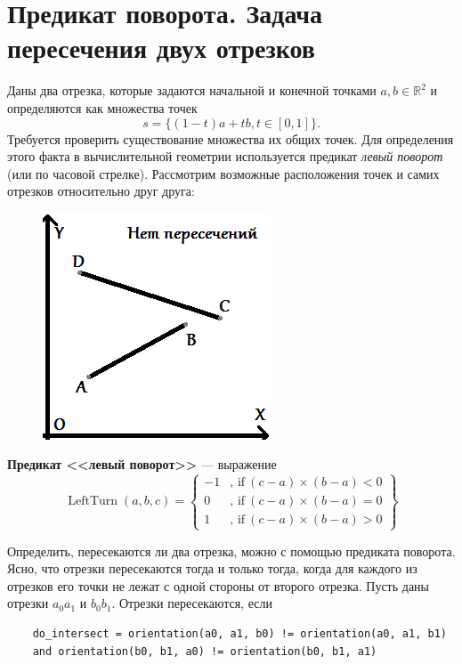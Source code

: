 \section{Предикат поворота. Задача пересечения двух отрезков}

Даны два отрезка, которые задаются начальной и конечной точками $a, b \in \mathbb{R}^2$ и определяются как множества точек
$$ s = \{ (1-t)a + tb, t \in [0,1] \}. $$
Требуется проверить существование множества их общих точек. Для определения этого факта в вычислительной геометрии используется предикат \textit{левый поворот} (или по часовой стрелке). Рассмотрим возможные расположения точек и самих отрезков относительно друг друга:


\begin{figure}[h!]
	\centering
	\includegraphics[width=0.4\linewidth]{img_easy/12_1.png}
	\captionsetup{labelformat=empty}
	\caption{}
\end{figure}

\textbf{Предикат <<левый поворот>>} --- выражение
$$
	\operatorname{LeftTurn}(a, b, c) =\left\{
	\begin{array}{rl}
		-1 &\mbox{, if}\ (c - a)\times(b - a) < 0\\
		0 &\mbox{, if}\ (c - a)\times(b - a) = 0\\
		1 &\mbox{, if}\ (c - a)\times(b - a) > 0
	\end{array}
	\right\}
$$

Определить, пересекаются ли два отрезка, можно с помощью предиката поворота. Ясно, что отрезки пересекаются тогда и только тогда, когда для каждого из отрезков его точки не лежат с одной стороны от второго отрезка. Пусть даны отрезки $a_0a_1$ и $b_0b_1$. Отрезки пересекаются, если

\begin{verbatim}
	do_intersect = orientation(a0, a1, b0) != orientation(a0, a1, b1)
	and orientation(b0, b1, a0) != orientation(b0, b1, a1)	
\end{verbatim}

